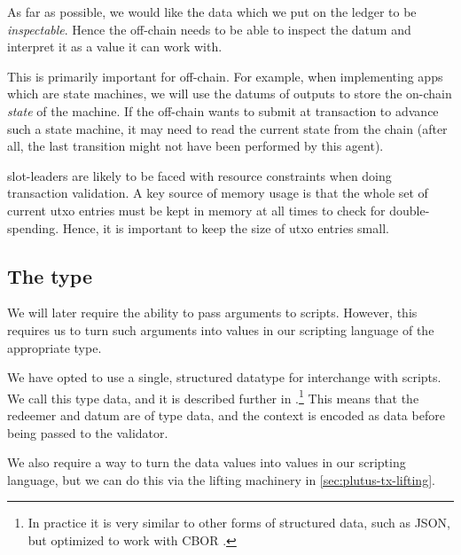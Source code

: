 \begin{requirement}[Inspectability]
\label{req:ledger-inspectability}
As far as possible, we would like the data which we put on the ledger to be \emph{inspectable}.
Hence the \gls{off-chain} needs to be able to inspect the \gls{datum} and interpret it as a value it can work with.

This is primarily important for \gls{off-chain}.
For example, when implementing \glspl{app} which are state machines, we will use the \glspl{datum} of outputs to store the on-chain \emph{state} of the machine.
If the \gls{off-chain} wants to submit at transaction to advance such a state machine, it may need to read the current state from the chain (after all, the last transition might not have been performed by this agent).
\end{requirement}

\begin{requirement}
\label{req:ledger-utxo-size}
\Glspl{slot-leader} are likely to be faced with resource constraints when doing transaction validation.
A key source of memory usage is that the whole set of current \gls{utxo} entries must be kept in memory at all times to check for double-spending.
Hence, it is important to keep the size of \gls{utxo} entries small.
\end{requirement}

\subsection{The  type}
\label{sec:data}

We will later require the ability to pass arguments to \glspl{script}.
However, this requires us to turn such arguments into values in our scripting language of the appropriate type.

We have opted to use a single, structured datatype for interchange with \glspl{script}.
We call this type \gls{data}, and it is described further in \textcite{eutxo}.\footnote{
  In practice it is very similar to other forms of structured data, such as JSON, but optimized to work with CBOR \autocite{cbor}.
}
This means that the \gls{redeemer} and \gls{datum} are of type \gls{data}, and the \gls{context} is encoded as \gls{data} before being passed to the \gls{validator}.

We also require a way to turn the \gls{data} values into values in our scripting language, but we can do this via the lifting machinery in \cref{sec:plutus-tx-lifting}.

